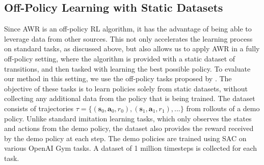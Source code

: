 \documentclass{article} \usepackage{iclr2020_conference,times}
\def\rva{{\mathbf{a}}}
\def\rvs{{\mathbf{s}}}
\begin{document}
\subsection{Off-Policy Learning with Static Datasets}

Since AWR is an off-policy RL algorithm, it has the advantage of being able to leverage data from other sources. This not only accelerates the learning process on standard tasks, as discussed above, but also allows us to apply AWR in a fully off-policy setting, where the algorithm is provided with a static dataset of transitions, and then tasked with learning the best possible policy. To evaluate our method in this setting, we use the off-policy tasks proposed by \citet{BEAR2019}. The objective of these tasks is to learn policies solely from static datasets, without collecting any additional data from the policy that is being trained. The dataset consists of trajectories $\tau = \{\left(\rvs_0, \rva_0, r_0 \right), \left(\rvs_1, \rva_1, r_1 \right), ... \}$ from rollouts of a demo policy. Unlike standard imitation learning tasks, which only observes the states and actions from the demo policy, the dataset also provides the reward received by the demo policy at each step. The demo policies are trained using SAC on various OpenAI Gym tasks.
A dataset of 1 million timesteps is collected for each task. 
\end{document}
